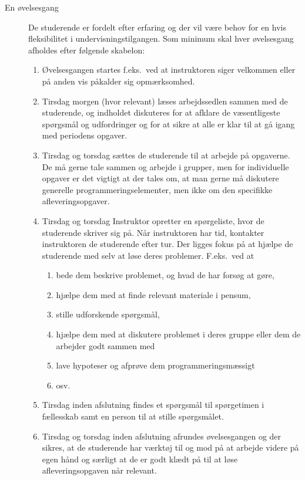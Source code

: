 \documentclass[a4paper]{article}
\begin{document}
\begin{description}
\item[En øvelsesgang] De studerende er fordelt efter erfaring og der
  vil være behov for en hvis fleksibilitet i
  undervisningstilgangen. Som minimum skal hver øvelsesgang afholdes
  efter følgende skabelon:
  \begin{enumerate}
  \item Øvelsesgangen startes f.eks.\ ved at instruktoren siger
    velkommen eller på anden vis påkalder sig opmærksomhed.
  \item Tirsdag morgen (hvor relevant) læses arbejdssedlen sammen med
    de studerende, og indholdet diskuteres for at afklare de
    væsentligeste spørgsmål og udfordringer og for at sikre at alle er
    klar til at gå igang med periodens opgaver.
  \item Tirsdag og torsdag sættes de studerende til at arbejde på
    opgaverne. De må gerne tale sammen og arbejde i grupper, men for
    individuelle opgaver er det vigtigt at der tales om, at man gerne
    må diskutere generelle programmeringselementer, men ikke om den
    specifikke afleveringsopgaver.
  \item Tirsdag og torsdag Instruktor opretter en spørgeliste, hvor de studerende skriver
    sig på. Når instruktoren har tid, kontakter instruktoren de
    studerende efter tur. Der ligges fokus på at hjælpe de studerende
    med selv at løse deres problemer. F.eks.\ ved at
    \begin{enumerate}
    \item bede dem beskrive problemet, og hvad de har forsøg at gøre,
    \item hjælpe dem med at finde relevant materiale i pensum,
    \item stille udforskende spørgsmål, 
    \item hjælpe dem med at diskutere problemet i deres gruppe eller
      dem de arbejder godt sammen med
    \item lave hypoteser og afprøve dem programmeringsmæssigt
    \item osv.
    \end{enumerate}
  \item Tirsdag inden afslutning findes et spørgsmål til spørgetimen i
    fællesskab samt en person til at stille spørgsmålet.
  \item Tirsdag og torsdag inden afslutning afrundes øvelsesgangen og
    der sikres, at de studerende har værktøj til og mod på at arbejde
    videre på egen hånd og særligt at de er godt klædt på til at løse
    afleveringsopgaven når relevant.
  \end{enumerate}
  

\end{description}
\end{document}
